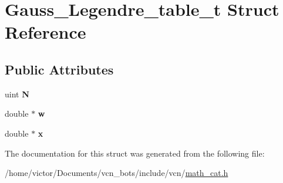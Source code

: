 \hypertarget{structGauss__Legendre__table__t}{\section{Gauss\+\_\+\+Legendre\+\_\+table\+\_\+t Struct Reference}
\label{structGauss__Legendre__table__t}
}
\subsection*{Public Attributes}
\begin{DoxyCompactItemize}
\item 
\hypertarget{structGauss__Legendre__table__t_a65c9c57270ee3d5da55b51391828b97d}{uint {\bfseries N}}\label{structGauss__Legendre__table__t_a65c9c57270ee3d5da55b51391828b97d}

\item 
\hypertarget{structGauss__Legendre__table__t_a458303bf21370746e1c801df4f7e45ed}{double $\ast$ {\bfseries w}}\label{structGauss__Legendre__table__t_a458303bf21370746e1c801df4f7e45ed}

\item 
\hypertarget{structGauss__Legendre__table__t_afa734bf974e2eadf30795d84d7a204d0}{double $\ast$ {\bfseries x}}\label{structGauss__Legendre__table__t_afa734bf974e2eadf30795d84d7a204d0}

\end{DoxyCompactItemize}


The documentation for this struct was generated from the following file\+:\begin{DoxyCompactItemize}
\item 
/home/victor/\+Documents/vcn\+\_\+bots/include/vcn/\hyperlink{math__cat_8h}{math\+\_\+cat.\+h}\end{DoxyCompactItemize}
